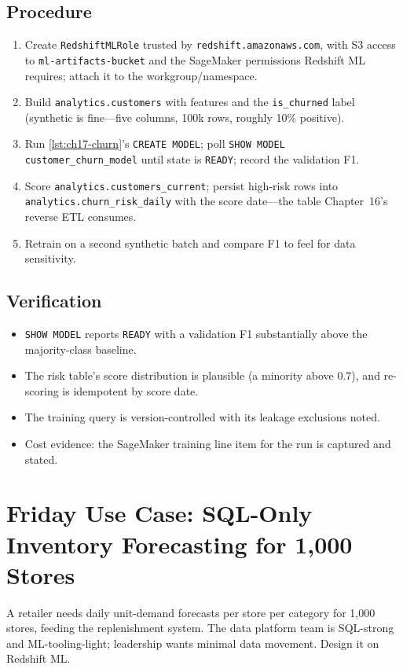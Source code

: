 \subsection*{Procedure}
\begin{enumerate}
    \item Create \texttt{RedshiftMLRole} trusted by \texttt{redshift.amazonaws.com}, with S3 access to \texttt{ml-artifacts-bucket} and the SageMaker permissions Redshift ML requires; attach it to the workgroup/namespace.
    \item Build \texttt{analytics.customers} with features and the \texttt{is\_churned} label (synthetic is fine---five columns, 100k rows, roughly 10\% positive).
    \item Run \cref{lst:ch17-churn}'s \texttt{CREATE MODEL}; poll \texttt{SHOW MODEL customer\_churn\_model} until state is \texttt{READY}; record the validation F1.
    \item Score \texttt{analytics.customers\_current}; persist high-risk rows into \texttt{analytics.churn\_risk\_daily} with the score date---the table Chapter~16's reverse ETL consumes.
    \item Retrain on a second synthetic batch and compare F1 to feel for data sensitivity.
\end{enumerate}

\subsection*{Verification}
\begin{itemize}
    \item \texttt{SHOW MODEL} reports \texttt{READY} with a validation F1 substantially above the majority-class baseline.
    \item The risk table's score distribution is plausible (a minority above 0.7), and re-scoring is idempotent by score date.
    \item The training query is version-controlled with its leakage exclusions noted.
    \item Cost evidence: the SageMaker training line item for the run is captured and stated.
\end{itemize}

\section{Friday Use Case: SQL-Only Inventory Forecasting for 1,000 Stores}
A retailer needs daily unit-demand forecasts per store per category for 1{,}000 stores, feeding the replenishment system. The data platform team is SQL-strong and ML-tooling-light; leadership wants minimal data movement. Design it on Redshift ML.

